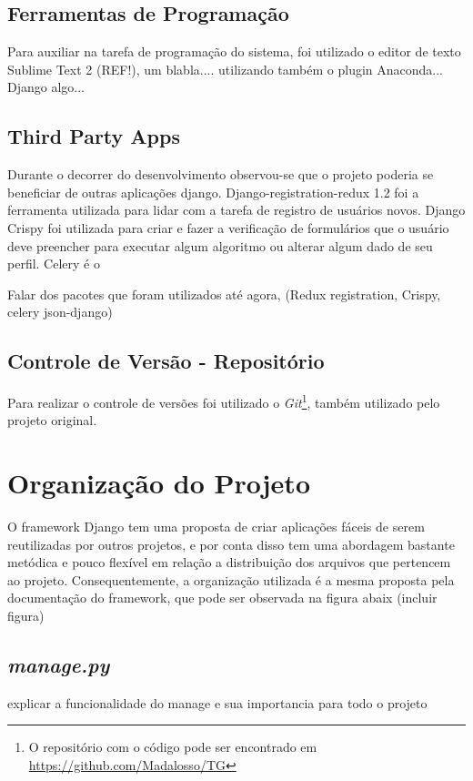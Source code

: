 \documentclass[tg]{mdtufsm}
\begin{document}
\subsection{Ferramentas de Programação}
Para auxiliar na tarefa de programação do sistema, foi utilizado o editor de texto Sublime Text 2 (REF!), um blabla.... utilizando também o plugin Anaconda... Django algo...

\subsection{Third Party Apps}
Durante o decorrer do desenvolvimento observou-se que o projeto poderia se beneficiar de outras aplicações django. 
Django-registration-redux 1.2 foi a ferramenta utilizada para lidar com a tarefa de registro de usuários novos.
Django Crispy foi utilizada para criar e fazer a verificação de formulários que o usuário deve preencher para executar algum algoritmo ou alterar algum dado de seu perfil.
Celery é o

Falar dos pacotes que foram utilizados até agora, (Redux registration, Crispy, celery json-django)

\subsection{Controle de Versão - Repositório}

Para realizar o controle de versões foi utilizado o \emph{Git}\footnote{O repositório com o código pode ser encontrado em \url{https://github.com/Madalosso/TG}}, também utilizado pelo projeto original.

\section{Organização do Projeto}

O framework Django tem uma proposta de criar aplicações fáceis de serem reutilizadas por outros projetos, e por conta disso tem uma abordagem bastante metódica e pouco flexível em relação a distribuição dos arquivos que pertencem ao projeto. Consequentemente, a organização utilizada é a mesma proposta pela documentação do framework, que pode ser observada na figura abaix (incluir figura)

\subsection{\emph{manage.py}}
explicar a funcionalidade do manage e sua importancia para todo o projeto
\end{document}
